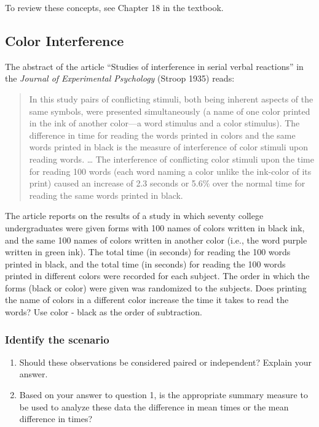 \documentclass[
]{report}
\begin{document}
To review these concepts, see Chapter 18 in the textbook.

\hypertarget{color-interference}{%
\subsection{Color Interference}\label{color-interference}}

The abstract of the article ``Studies of interference in serial verbal reactions'' in the \emph{Journal of Experimental Psychology} (Stroop 1935) reads:

\begin{quote}
In this study pairs of conflicting stimuli, both being inherent aspects of the same symbols, were presented simultaneously (a name of one color printed in the ink of another color---a word stimulus and a color stimulus).
The difference in time for reading the words printed in colors and the same words printed in black is the measure of interference of color stimuli upon reading words. \ldots{}
The interference of conflicting color stimuli upon the time for reading 100 words (each word naming a color unlike the ink-color of its print) caused an increase of 2.3 seconds or 5.6\% over the normal time for reading the same words printed in black.
\end{quote}

The article reports on the results of a study in which seventy college undergraduates were given forms with 100 names of colors written in black ink, and the same 100 names of colors written in another color (i.e., the word purple written in green ink). The total time (in seconds) for reading the 100 words printed in black, and the total time (in seconds) for reading the 100 words printed in different colors were recorded for each subject. The order in which the forms (black or color) were given was randomized to the subjects. Does printing the name of colors in a different color increase the time it takes to read the words? Use color - black as the order of subtraction.

\hypertarget{identify-the-scenario}{%
\subsubsection*{Identify the scenario}\label{identify-the-scenario}}

\begin{enumerate}
\def\labelenumi{\arabic{enumi}.}
\item
  Should these observations be considered paired or independent? Explain your answer.
  \vspace{0.5in}
\item
  Based on your answer to question 1, is the appropriate summary measure to be used to analyze these data the difference in mean times or the mean difference in times?
  \vspace{0.25in}
\end{enumerate}
\end{document}
